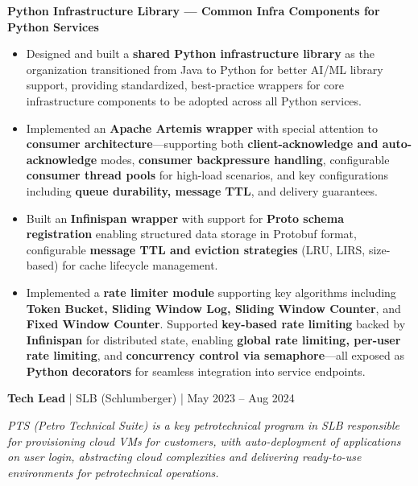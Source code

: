 \documentclass[a4paper,11pt]{article}
\newcommand{\jobtitle}[4]{
  \vspace{6pt}
  {\textbf{\textcolor{accent}{#1}} | #2 | #3}
  \vspace{2pt}
}
\begin{document}
\vspace{4pt}
\textbf{Python Infrastructure Library --- Common Infra Components for Python Services}
\begin{itemize}[leftmargin=*, nosep]
  \item Designed and built a \textbf{shared Python infrastructure library} as the organization transitioned from Java to Python for better AI/ML library support, providing standardized, best-practice wrappers for core infrastructure components to be adopted across all Python services.
  \item Implemented an \textbf{Apache Artemis wrapper} with special attention to \textbf{consumer architecture}---supporting both \textbf{client-acknowledge and auto-acknowledge} modes, \textbf{consumer backpressure handling}, configurable \textbf{consumer thread pools} for high-load scenarios, and key configurations including \textbf{queue durability, message TTL}, and delivery guarantees.
  \item Built an \textbf{Infinispan wrapper} with support for \textbf{Proto schema registration} enabling structured data storage in Protobuf format, configurable \textbf{message TTL and eviction strategies} (LRU, LIRS, size-based) for cache lifecycle management.
  \item Implemented a \textbf{rate limiter module} supporting key algorithms including \textbf{Token Bucket, Sliding Window Log, Sliding Window Counter}, and \textbf{Fixed Window Counter}. Supported \textbf{key-based rate limiting} backed by \textbf{Infinispan} for distributed state, enabling \textbf{global rate limiting, per-user rate limiting}, and \textbf{concurrency control via semaphore}---all exposed as \textbf{Python decorators} for seamless integration into service endpoints.
\end{itemize}

\vspace{8pt}
\jobtitle{Tech Lead}{SLB (Schlumberger)}{May 2023 -- Aug 2024}{}

\textit{PTS (Petro Technical Suite) is a key petrotechnical program in SLB responsible for provisioning cloud VMs for customers, with auto-deployment of applications on user login, abstracting cloud complexities and delivering ready-to-use environments for petrotechnical operations.}
\end{document}
